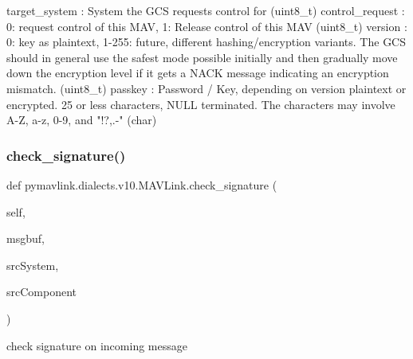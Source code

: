 \begin{DoxyVerb}
\begin{DoxyVerb}
\begin{DoxyVerb}
target_system             : System the GCS requests control for (uint8_t)
control_request           : 0: request control of this MAV, 1: Release control of this MAV (uint8_t)
version                   : 0: key as plaintext, 1-255: future, different hashing/encryption variants. The GCS should in general use the safest mode possible initially and then gradually move down the encryption level if it gets a NACK message indicating an encryption mismatch. (uint8_t)
passkey                   : Password / Key, depending on version plaintext or encrypted. 25 or less characters, NULL terminated. The characters may involve A-Z, a-z, 0-9, and "!?,.-" (char)\end{DoxyVerb}
 \mbox{\label{classpymavlink_1_1dialects_1_1v10_1_1MAVLink_a67d5d577fe7fc0a07a020f05e55703b9}} 
\subsubsection{\texorpdfstring{check\+\_\+signature()}{check\_signature()}}
{\footnotesize\ttfamily def pymavlink.\+dialects.\+v10.\+M\+A\+V\+Link.\+check\+\_\+signature (\begin{DoxyParamCaption}\item[{}]{self,  }\item[{}]{msgbuf,  }\item[{}]{src\+System,  }\item[{}]{src\+Component }\end{DoxyParamCaption})}

\begin{DoxyVerb}check signature on incoming message\end{DoxyVerb}
 \mbox{\label{classpymavlink_1_1dialects_1_1v10_1_1MAVLink_af2578875510284096cff3b214c9aefa3}} 

\end{DoxyVerb}
\end{DoxyVerb}
